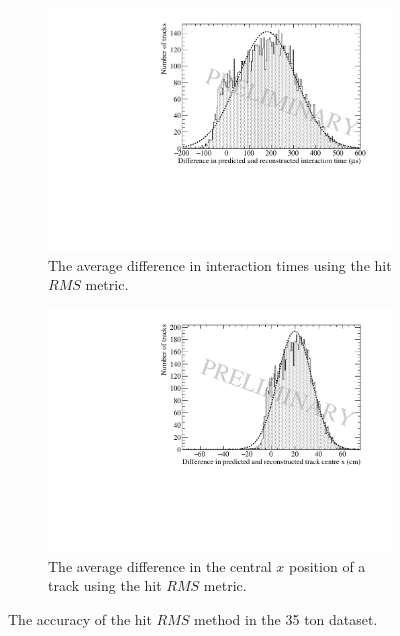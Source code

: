 \begin{figure}[h!]
  \centering
  \begin{subfigure}{0.6\textwidth}
    \centering
    \includegraphics[width=\textwidth]{Data_AvTimeDiff_RMS}
    \caption{The average difference in interaction times using the hit $RMS$ metric.}
    \label{fig:DiffDataAvDiff_RMS_T}
  \end{subfigure}

  \begin{subfigure}{0.6\textwidth}
    \centering
    \includegraphics[width=\textwidth]{Data_AvXPosDiff_RMS}
    \caption{The average difference in the central $x$ position of a track using the hit $RMS$ metric.}
    \label{fig:DiffDataAvDiff_RMS_X}
  \end{subfigure}
  \caption[The accuracy of the hit $RMS$ method in the 35 ton dataset]
          {The accuracy of the hit $RMS$ method in the 35 ton dataset.}
  \label{fig:DiffDataAvDiff_RMS}
\end{figure}

